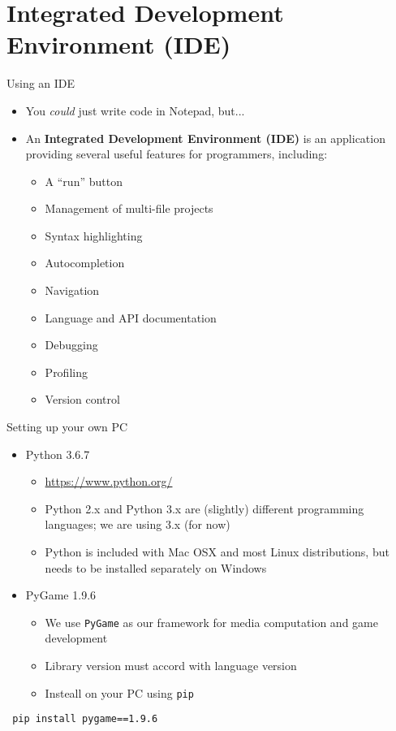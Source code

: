 \part{Integrated Development Environment (IDE)}
\frame{\partpage}

\begin{frame}{Using an IDE}
\begin{itemize}
	\item You \textit{could} just write code in Notepad, but...
	\item An \textbf{Integrated Development Environment (IDE)} is an application providing several
	useful features for programmers, including:
	\begin{itemize}
		\item A ``run'' button
		\item Management of multi-file projects
		\item Syntax highlighting
		\item Autocompletion
		\item Navigation
		\item Language and API documentation
		\item Debugging
		\item Profiling
		\item Version control
	\end{itemize}
\end{itemize}
\end{frame}

\begin{frame}[fragile]{Setting up your own PC}
\begin{itemize}
	\item Python 3.6.7
	\begin{itemize}
		\item \url{https://www.python.org/}
		\item Python 2.x and Python 3.x are (slightly) different programming languages; we are using 3.x (for now)
		\item Python is included with Mac OSX and most Linux distributions, but needs to be installed separately on Windows
	\end{itemize}

	\item PyGame 1.9.6
	\begin{itemize}
	\item We use \texttt{PyGame} as our framework for media computation and game development
	\item Library version must accord with language version
	\item Insteall on your PC using \texttt{pip}
	\end{itemize}
\end{itemize}

 \begin{lstlisting}
 pip install pygame==1.9.6
 \end{lstlisting}

\end{frame}

